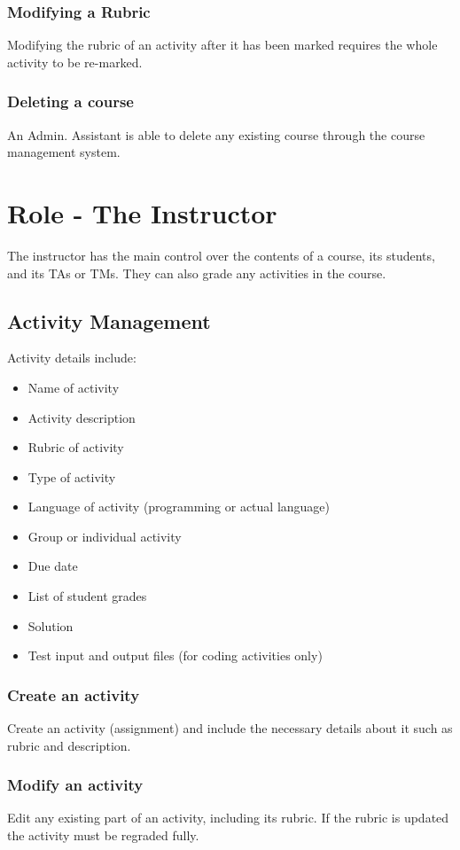 \documentclass{article}
\begin{document}
\subsubsection{Modifying a Rubric}
Modifying the rubric of an activity after it has been marked requires the whole
activity to be re-marked.
\subsubsection{Deleting a course}
An Admin. Assistant is able to delete any existing course through the course management system.

\section{Role - The Instructor}
The instructor has the main control over the contents of a course, its students, 
and its TAs or TMs. They can also grade any activities in the course.
\subsection{Activity Management}
Activity details include:
\begin {itemize}
	\item Name of activity
	\item Activity description
	\item Rubric of activity
	\item Type of activity
	\item Language of activity (programming or actual language)
	\item Group or individual activity
	\item Due date
	\item List of student grades
	\item Solution
	\item Test input and output files (for coding activities only)
\end {itemize}
\subsubsection{Create an activity}
Create an activity (assignment) and include the necessary details about it such 
as rubric and description.
\subsubsection{Modify an activity}
Edit any existing part of an activity, including its rubric. If the rubric is updated
the activity must be regraded fully.
\end{document}
